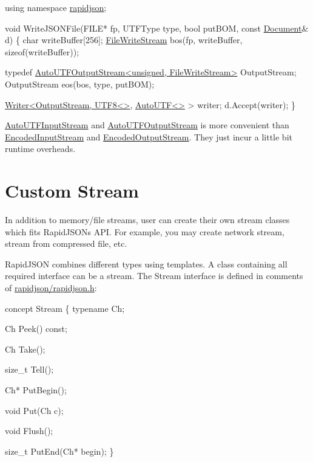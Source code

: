 \begin{DoxyCode}
\textcolor{keyword}{using namespace }\hyperlink{namespacerapidjson}{rapidjson};

\textcolor{keywordtype}{void} WriteJSONFile(FILE* fp, UTFType type, \textcolor{keywordtype}{bool} putBOM, \textcolor{keyword}{const} \hyperlink{class_generic_document}{Document}& d) \{
    \textcolor{keywordtype}{char} writeBuffer[256];
    \hyperlink{class_file_write_stream}{FileWriteStream} bos(fp, writeBuffer, \textcolor{keyword}{sizeof}(writeBuffer));

    \textcolor{keyword}{typedef} \hyperlink{class_auto_u_t_f_output_stream}{AutoUTFOutputStream<unsigned, FileWriteStream>} 
      OutputStream;
    OutputStream eos(bos, type, putBOM);

    \hyperlink{class_writer}{Writer<OutputStream, UTF8<>}, \hyperlink{struct_auto_u_t_f}{AutoUTF<>} > writer;
    d.Accept(writer);
\}
\end{DoxyCode}


{\ttfamily \hyperlink{class_auto_u_t_f_input_stream}{Auto\+U\+T\+F\+Input\+Stream}} and {\ttfamily \hyperlink{class_auto_u_t_f_output_stream}{Auto\+U\+T\+F\+Output\+Stream}} is more convenient than {\ttfamily \hyperlink{class_encoded_input_stream}{Encoded\+Input\+Stream}} and {\ttfamily \hyperlink{class_encoded_output_stream}{Encoded\+Output\+Stream}}. They just incur a little bit runtime overheads.\hypertarget{md_Cadriciel_Commun_Externe_RapidJSON_doc_stream.zh-cn_CustomStream}{}\section{Custom Stream}\label{md_Cadriciel_Commun_Externe_RapidJSON_doc_stream.zh-cn_CustomStream}
In addition to memory/file streams, user can create their own stream classes which fits Rapid\+J\+S\+ON\textquotesingle{}s A\+PI. For example, you may create network stream, stream from compressed file, etc.

Rapid\+J\+S\+ON combines different types using templates. A class containing all required interface can be a stream. The Stream interface is defined in comments of {\ttfamily \hyperlink{rapidjson_8h}{rapidjson/rapidjson.\+h}}\+:


\begin{DoxyCode}
concept Stream \{
    \textcolor{keyword}{typename} Ch;    

    Ch Peek() \textcolor{keyword}{const};

    Ch Take();

    \textcolor{keywordtype}{size\_t} Tell();

    Ch* PutBegin();

    \textcolor{keywordtype}{void} Put(Ch c);

    \textcolor{keywordtype}{void} Flush();

    \textcolor{keywordtype}{size\_t} PutEnd(Ch* begin);
\}
\end{DoxyCode}


